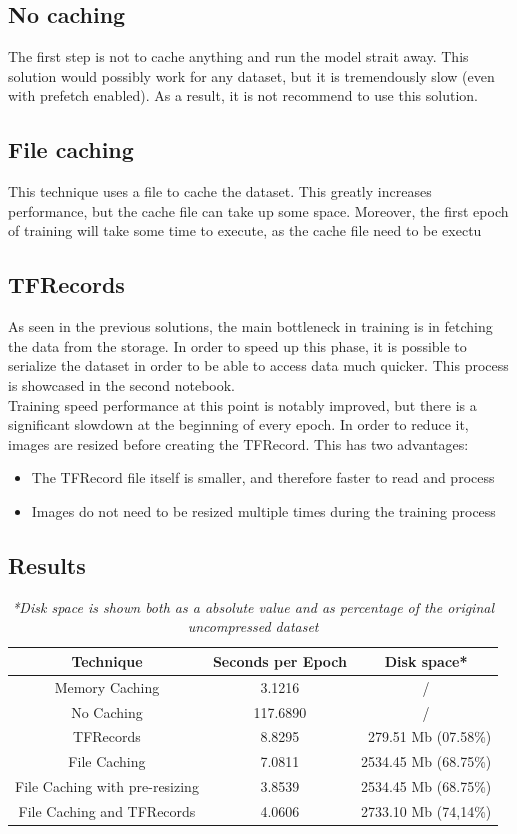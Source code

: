 \documentclass[a4paper,12pt]{article}
\begin{document}
\subsection{No caching}
The first step is not to cache anything and run the model strait away. This solution would possibly work for any dataset, but it is tremendously slow (even with prefetch enabled).
As a result, it is not recommend to use this solution.

\subsection{File caching}
This technique uses a file to cache the dataset. This greatly increases performance, but the cache file can take up some space. Moreover, the first epoch of training will take some time to execute, as the cache file need to be exectu

\subsection{TFRecords}
As seen in the previous solutions, the main bottleneck in training is in fetching the data from the storage. In order to speed up this phase, it is possible to serialize the dataset in order to be able to access data much quicker. This process is showcased in the second notebook.\\
 Training speed performance at this point is notably improved, but there is a significant slowdown at the beginning of every epoch. In order to reduce it, images are resized before creating the TFRecord. This has two advantages:
\begin{itemize}
\item The TFRecord file itself is smaller, and therefore faster to read and process
\item Images do not need to be resized multiple times during the training process
\end{itemize}
 
\subsection{Results}
\begin{table}
	\centering
	\begin{tabular}{ccc}
	\textbf{Technique} & \textbf{Seconds per Epoch} & \textbf{Disk space*}\\ \hline
	Memory Caching 				& 3.1216 & /\\ \hdashline
	No Caching					& 117.6890 & / \\
	TFRecords 					& 8.8295 & \ 279.51 Mb (07.58\%)\\
	File Caching					& 7.0811	 & 2534.45 Mb (68.75\%)\\
	File Caching with pre-resizing & 3.8539 & 2534.45 Mb (68.75\%)\\
	File Caching and TFRecords 	& 4.0606 &2733.10 Mb (74,14\%)\\
	\end{tabular}
	\captionsetup{labelformat=empty}
	\caption{\textit{*Disk space is shown both as a absolute value and as percentage of the original uncompressed dataset}}
\end{table}
\end{document}
